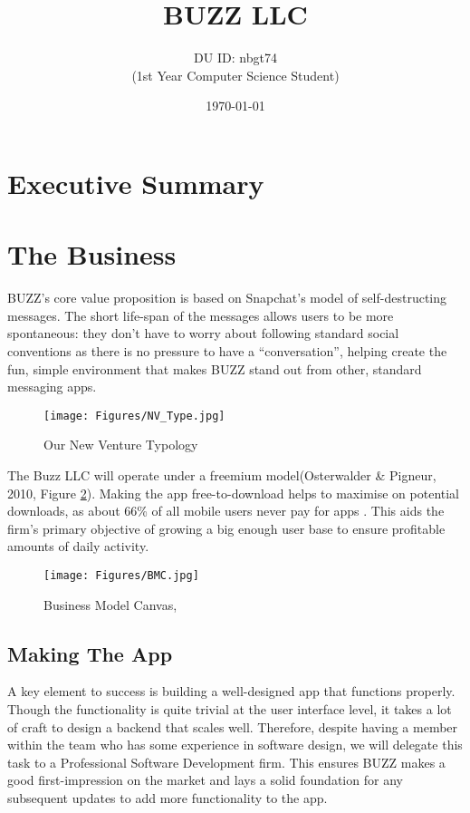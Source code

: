 \documentclass[12pt]{article}
\title{BUZZ LLC}
\author{DU ID: nbgt74 \\(1st Year Computer Science Student)}
\date{\today}
\begin{document}
\maketitle


\tableofcontents
\listoffigures
\clearpage


\section{Executive Summary}
 


\newpage

\section{The Business}

BUZZ's core value proposition is based on Snapchat’s model of self-destructing messages. The short life-span of the messages allows users to be more spontaneous: they don’t have to worry about following standard social conventions as there is no pressure to have a “conversation”, helping create the fun, simple environment that makes BUZZ stand out from other, standard messaging apps.

\begin{figure}[!h]
    \centering
    \texttt{[image: Figures/NV\_Type.jpg]}
    \caption{Our New Venture Typology \cite{Burns2014} }
    \label{fig:nv type}
\end{figure}

The Buzz LLC will operate under a freemium model(Osterwalder \& Pigneur, 2010, Figure \ref{fig:bmc}). Making the app free-to-download helps to maximise on potential downloads, as about 66\% of all mobile users never pay for apps \cite{eMarketer2015} . This aids the firm's primary objective of growing a big enough user base to ensure profitable amounts of daily activity.


\begin{figure}
    \centering
    \texttt{[image: Figures/BMC.jpg]}
    \caption{Business Model Canvas, \cite{Osterwalder2010}}
    \label{fig:bmc}
\end{figure}

\subsection{Making The App}

A key element to success is building a well-designed app that functions properly. Though the functionality is quite trivial at the user interface level, it takes a lot of craft to design a backend that scales well.
Therefore, despite having a member within the team who has some experience in software design, we will delegate this task to a Professional Software Development firm. This ensures BUZZ makes a good first-impression on the market and lays a solid foundation for any subsequent updates to add more functionality to the app.
\end{document}

